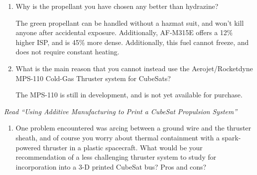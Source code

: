 \documentclass[onecolumn,10pt]{jhwhw}
\begin{document}
\begin{enumerate}
\item Why is the propellant you have chosen any better than hydrazine?

The green propellant can be handled without a hazmat suit, and won't kill anyone after accidental exposure. Additionally, AF-M315E offers a 12\% higher ISP, and is 45\% more dense. Additionally, this fuel cannot freeze, and does not require constant heating.

\item What is the main reason that you cannot instead use the Aerojet/Rocketdyne MPS-110 Cold-Gas Thruster system for CubeSats?

The MPS-110 is still in development, and is not yet available for purchase.

\end{enumerate}

\problem{}
\textit{Read ``Using Additive Manufacturing to Print a CubeSat Propulsion System''}
\begin{enumerate}
\item One problem encountered was arcing between a ground wire and the thruster sheath, and of course you worry about thermal containment with a spark-powered thruster in a plastic spacecraft. What would be your recommendation of a less challenging thruster system to study for incorporation into a 3-D printed CubeSat bus? Pros and cons?
\end{enumerate}
\end{document}
